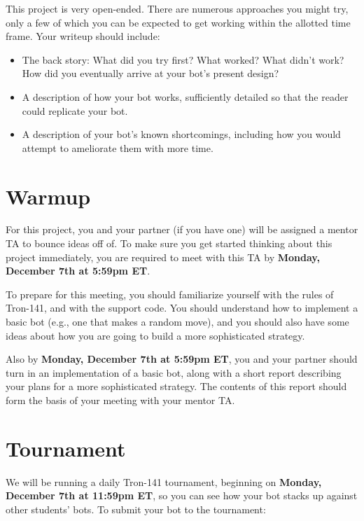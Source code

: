 \documentclass{article}
\begin{document}
This project is very open-ended.  There are numerous approaches you
might try, only a few of which you can be expected to get working
within the allotted time frame.  Your writeup should include:

\begin{itemize}
\item The back story: What did you try first?  What worked?  What
  didn't work?  How did you eventually arrive at your bot's present
  design?
  
\item A description of how your bot works, sufficiently detailed so
  that the reader could replicate your bot.

\item A description of your bot's known shortcomings, including how
  you would attempt to ameliorate them with more time.
\end{itemize}


\section{Warmup}
For this project, you and your partner (if you have one) will be
assigned a mentor TA to bounce ideas off of.  To make sure you get
started thinking about this project immediately, you are required to
meet with this TA by \textbf{Monday, December 7th at 5:59pm ET}.

To prepare for this meeting, you should familiarize yourself with the
rules of Tron-141, and with the support code.  You should understand
how to implement a basic bot (e.g., one that makes a random move), and
you should also have some ideas about how you are going to build a
more sophisticated strategy.

Also by \textbf{Monday, December 7th at 5:59pm ET}, you and your
partner should turn in an implementation of a basic bot, along with a
short report describing your plans for a more sophisticated strategy.
The contents of this report should form the basis of your meeting with
your mentor TA.


\section{Tournament}
We will be running a daily Tron-141 tournament, beginning on
\textbf{Monday, December 7th at 11:59pm ET}, so you can see how your
bot stacks up against other students' bots.  To submit your bot to the
tournament:
\end{document}
